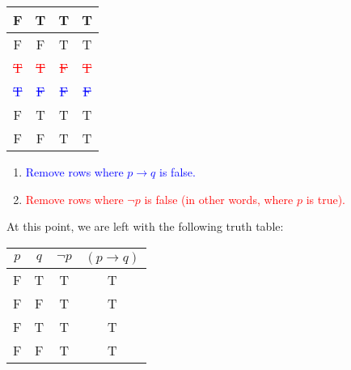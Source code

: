 \documentclass{article}
\begin{document}
\begin{enumerate}
\begin{table}[h]
\begin{tabular}{|c|c||c|c|}
                  F                          & T                          & T                          & T                          \\ \hline
                  F                          & F                          & T                          & T                          \\ \hline
                  \textcolor{red}{\sout{T}}  & \textcolor{red}{\sout{T}}  & \textcolor{red}{\sout{F}}  & \textcolor{red}{\sout{T}}  \\ \hline
                  \textcolor{blue}{\sout{T}} & \textcolor{blue}{\sout{F}} & \textcolor{blue}{\sout{F}} & \textcolor{blue}{\sout{F}} \\ \hline
                  F                          & T                          & T                          & T                          \\ \hline
                  F                          & F                          & T                          & T                          \\ \hline
              \end{tabular}
          \end{table}

          \begin{enumerate}
              \item \textcolor{blue}{Remove rows where $p \rightarrow q$ is false.}
              \item \textcolor{red}{Remove rows where $\neg p$ is false (in other words, where $p$ is true).}
          \end{enumerate}

          At this point, we are left with the following truth table:

          \begin{table}[h]
              \centering
              \begin{tabular}{|c|c||c|c|}
                  \hline
                  $p$ & $q$ & $\neg p$ & $(p \rightarrow q)$ \\ \hline
                  \hline
                  F   & T   & T        & T                   \\ \hline
                  F   & F   & T        & T                   \\ \hline
                  F   & T   & T        & T                   \\ \hline
                  F   & F   & T        & T                   \\ \hline
              \end{tabular}
          \end{table}


\end{enumerate}
\end{document}
